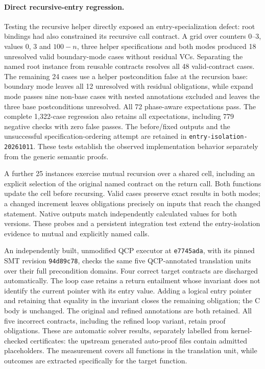 \paragraph{Direct recursive-entry regression.}
Testing the recursive helper directly exposed an entry-specialization defect:
root bindings had also constrained its recursive call contract. A grid over
counters 0--3, values 0, 3 and $100-n$, three helper specifications and both
modes produced 18 unresolved valid boundary-mode cases without residual VCs.
Separating the named root instance from reusable contracts resolves all 48
valid-contract cases. The remaining 24 cases use a helper postcondition false
at the recursion base: boundary mode leaves all 12 unresolved with residual
obligations, while expand mode passes nine non-base cases with nested
annotations excluded and leaves the three base postconditions unresolved.
All 72 phase-aware expectations pass. The complete 1,322-case regression also
retains all expectations, including 779 negative checks with zero false passes.
The before/fixed outputs and the unsuccessful specification-ordering attempt
are retained in \texttt{entry-isolation-20261011}. These tests establish the
observed implementation behavior separately from the generic semantic proofs.

A further 25 instances exercise mutual recursion over a shared cell, including
an explicit selection of the original named contract on the return call. Both
functions update the cell before recursing. Valid cases preserve exact results
in both modes; a changed increment leaves obligations precisely on inputs that
reach the changed statement. Native outputs match independently calculated
values for both versions. These probes and a persistent integration test extend
the entry-isolation evidence to mutual and explicitly named calls.


An independently built, unmodified QCP executor at \texttt{e7745ada}, with
its pinned SMT revision \texttt{94d89c78}, checks the same five QCP-annotated
translation units over their full precondition domains. Four correct target
contracts are discharged automatically. The loop case retains a return
entailment whose invariant does not identify the current pointer with its
entry value. Adding a logical entry pointer and retaining that equality in
the invariant closes the remaining obligation; the C body is unchanged.
The original and refined annotations are both retained. All five incorrect
contracts, including the refined loop variant, retain proof obligations.
These are automatic solver results, separately labelled from kernel-checked
certificates: the upstream generated auto-proof files contain admitted
placeholders. The measurement covers all functions in the translation unit,
while outcomes are extracted specifically for the target function.

